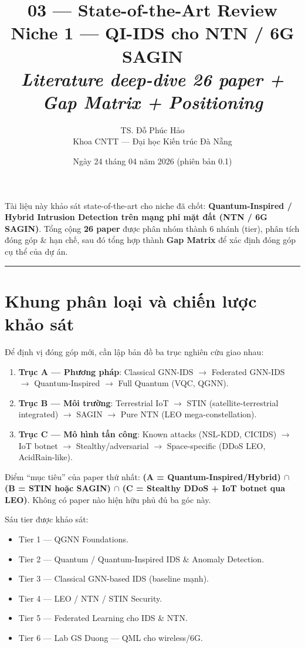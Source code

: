 \documentclass[11pt,a4paper]{article}
\title{\vspace{-1.5cm}\textbf{\color{accent} 03 --- State-of-the-Art Review} \\[3pt]
       \Large Niche 1 --- QI-IDS cho NTN / 6G SAGIN \\[2pt]
       \normalsize \textit{Literature deep-dive 26 paper + Gap Matrix + Positioning}}
\author{TS. Đỗ Phúc Hảo \\ \small Khoa CNTT --- Đại học Kiến trúc Đà Nẵng}
\date{Ngày 24 tháng 04 năm 2026 (phiên bản 0.1)}
\begin{document}
\maketitle
\thispagestyle{fancy}

\begin{note}
Tài liệu này khảo sát state-of-the-art cho niche đã chốt: \textbf{Quantum-Inspired / Hybrid Intrusion Detection trên mạng phi mặt đất (NTN / 6G SAGIN)}. Tổng cộng \textbf{26 paper} được phân nhóm thành 6 nhánh (tier), phân tích đóng góp \& hạn chế, sau đó tổng hợp thành \textbf{Gap Matrix} để xác định đóng góp cụ thể của dự án.
\end{note}

\tableofcontents
\vspace{0.4cm}
\hrule
\vspace{0.4cm}

\section{Khung phân loại và chiến lược khảo sát}

Để định vị đóng góp mới, cần lập bản đồ ba trục nghiên cứu giao nhau:

\begin{enumerate}
  \item \textbf{Trục A --- Phương pháp}: Classical GNN-IDS $\rightarrow$ Federated GNN-IDS $\rightarrow$ Quantum-Inspired $\rightarrow$ Full Quantum (VQC, QGNN).
  \item \textbf{Trục B --- Môi trường}: Terrestrial IoT $\rightarrow$ STIN (satellite-terrestrial integrated) $\rightarrow$ SAGIN $\rightarrow$ Pure NTN (LEO mega-constellation).
  \item \textbf{Trục C --- Mô hình tấn công}: Known attacks (NSL-KDD, CICIDS) $\rightarrow$ IoT botnet $\rightarrow$ Stealthy/adversarial $\rightarrow$ Space-specific (DDoS LEO, AcidRain-like).
\end{enumerate}

Điểm ``mục tiêu'' của paper thứ nhất: \textbf{(A = Quantum-Inspired/Hybrid) $\cap$ (B = STIN hoặc SAGIN) $\cap$ (C = Stealthy DDoS + IoT botnet qua LEO)}. Không có paper nào hiện hữu phủ đủ ba góc này.

Sáu tier được khảo sát:
\begin{itemize}
  \item Tier 1 --- QGNN Foundations.
  \item Tier 2 --- Quantum / Quantum-Inspired IDS \& Anomaly Detection.
  \item Tier 3 --- Classical GNN-based IDS (baseline mạnh).
  \item Tier 4 --- LEO / NTN / STIN Security.
  \item Tier 5 --- Federated Learning cho IDS \& NTN.
  \item Tier 6 --- Lab GS Duong --- QML cho wireless/6G.
\end{itemize}
\end{document}
